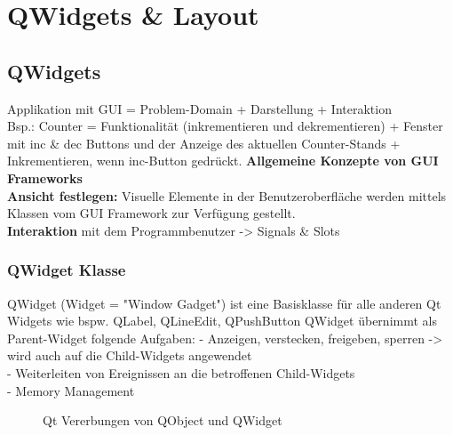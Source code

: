 \chapter{QWidgets \& Layout}

\section{QWidgets}
Applikation mit GUI = Problem-Domain + Darstellung + Interaktion \\
Bsp.: Counter = Funktionalität (inkrementieren und dekrementieren) + Fenster mit inc \& dec Buttons und der Anzeige des aktuellen Counter-Stands + Inkrementieren, wenn inc-Button gedrückt.
\textbf{Allgemeine Konzepte von GUI Frameworks} \\
\textbf{Ansicht festlegen:} Visuelle Elemente in der Benutzeroberfläche werden mittels Klassen vom GUI Framework zur Verfügung gestellt. \\
\textbf{Interaktion} mit dem Programmbenutzer -> Signals \& Slots

\subsection{QWidget Klasse}
QWidget (Widget = "Window Gadget") ist eine Basisklasse für alle anderen Qt Widgets wie bspw. QLabel, QLineEdit, QPushButton
QWidget übernimmt als Parent-Widget folgende Aufgaben:
- Anzeigen, verstecken, freigeben, sperren -> wird auch auf die Child-Widgets angewendet \\
- Weiterleiten von Ereignissen an die betroffenen Child-Widgets\\
- Memory Management \\
\begin{figure}[hb]
	\centering
{}
	\caption[]{Qt Vererbungen von QObject und QWidget}
\end{figure}

